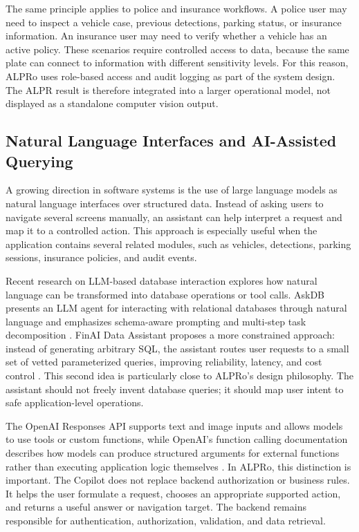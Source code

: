 ﻿\documentclass[12pt,a4paper]{article}
\begin{document}
The same principle applies to police and insurance workflows. A police user may need to inspect a vehicle case, previous detections, parking status, or insurance information. An insurance user may need to verify whether a vehicle has an active policy. These scenarios require controlled access to data, because the same plate can connect to information with different sensitivity levels. For this reason, ALPRo uses role-based access and audit logging as part of the system design. The ALPR result is therefore integrated into a larger operational model, not displayed as a standalone computer vision output.

\subsection{Natural Language Interfaces and AI-Assisted Querying}

A growing direction in software systems is the use of large language models as natural language interfaces over structured data. Instead of asking users to navigate several screens manually, an assistant can help interpret a request and map it to a controlled action. This approach is especially useful when the application contains several related modules, such as vehicles, detections, parking sessions, insurance policies, and audit events.

Recent research on LLM-based database interaction explores how natural language can be transformed into database operations or tool calls. AskDB presents an LLM agent for interacting with relational databases through natural language and emphasizes schema-aware prompting and multi-step task decomposition \cite{Phan2025AskDB}. FinAI Data Assistant proposes a more constrained approach: instead of generating arbitrary SQL, the assistant routes user requests to a small set of vetted parameterized queries, improving reliability, latency, and cost control \cite{Kim2025FinAI}. This second idea is particularly close to ALPRo's design philosophy. The assistant should not freely invent database queries; it should map user intent to safe application-level operations.

The OpenAI Responses API supports text and image inputs and allows models to use tools or custom functions, while OpenAI's function calling documentation describes how models can produce structured arguments for external functions rather than executing application logic themselves \cite{OpenAIResponses2026,OpenAIFunctionCalling2026}. In ALPRo, this distinction is important. The Copilot does not replace backend authorization or business rules. It helps the user formulate a request, chooses an appropriate supported action, and returns a useful answer or navigation target. The backend remains responsible for authentication, authorization, validation, and data retrieval.
\end{document}
